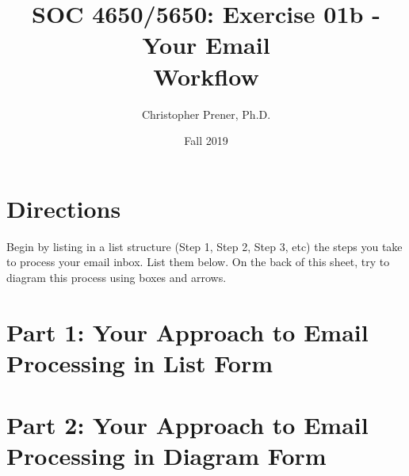 \documentclass{tufte-handout}
\title{SOC 4650/5650: Exercise 01b - Your Email \\Workflow}
\author{Christopher Prener, Ph.D.}
\date{Fall 2019}
\begin{document}
\maketitle %

\vspace{5mm}
\section{Directions}
Begin by listing in a list structure (Step 1, Step 2, Step 3, etc) the steps you take to process your email inbox. List them below. On the back of this sheet, try to diagram this process using boxes and arrows.

\vspace{5mm}
\section{Part 1: Your Approach to Email Processing in List Form}

\newpage
\section{Part 2: Your Approach to Email Processing in Diagram Form}

\end{document}
